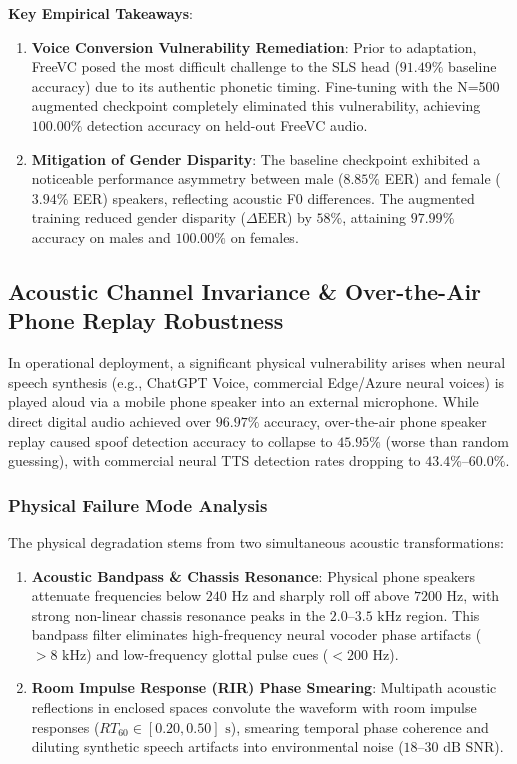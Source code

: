 \documentclass[11pt,a4paper]{article}
\begin{document}
\noindent\textbf{Key Empirical Takeaways}:
\begin{enumerate}
    \item \textbf{Voice Conversion Vulnerability Remediation}: Prior to adaptation, FreeVC posed the most difficult challenge to the SLS head ($91.49\%$ baseline accuracy) due to its authentic phonetic timing. Fine-tuning with the N=500 augmented checkpoint completely eliminated this vulnerability, achieving $100.00\%$ detection accuracy on held-out FreeVC audio.
    \item \textbf{Mitigation of Gender Disparity}: The baseline checkpoint exhibited a noticeable performance asymmetry between male ($8.85\%$ EER) and female ($3.94\%$ EER) speakers, reflecting acoustic F0 differences. The augmented training reduced gender disparity ($\Delta\text{EER}$) by $58\%$, attaining $97.99\%$ accuracy on males and $100.00\%$ on females.
\end{enumerate}

\subsection{Acoustic Channel Invariance \& Over-the-Air Phone Replay Robustness}
\label{sec:channel_robustness}
In operational deployment, a significant physical vulnerability arises when neural speech synthesis (e.g., ChatGPT Voice, commercial Edge/Azure neural voices) is played aloud via a mobile phone speaker into an external microphone. While direct digital audio achieved over $96.97\%$ accuracy, over-the-air phone speaker replay caused spoof detection accuracy to collapse to $45.95\%$ (worse than random guessing), with commercial neural TTS detection rates dropping to $43.4\%$--$60.0\%$.

\subsubsection{Physical Failure Mode Analysis}
The physical degradation stems from two simultaneous acoustic transformations:
\begin{enumerate}
    \item \textbf{Acoustic Bandpass \& Chassis Resonance}: Physical phone speakers attenuate frequencies below $240\text{ Hz}$ and sharply roll off above $7200\text{ Hz}$, with strong non-linear chassis resonance peaks in the $2.0$--$3.5\text{ kHz}$ region. This bandpass filter eliminates high-frequency neural vocoder phase artifacts ($>8\text{ kHz}$) and low-frequency glottal pulse cues ($<200\text{ Hz}$).
    \item \textbf{Room Impulse Response (RIR) Phase Smearing}: Multipath acoustic reflections in enclosed spaces convolute the waveform with room impulse responses ($RT_{60} \in [0.20, 0.50]\text{ s}$), smearing temporal phase coherence and diluting synthetic speech artifacts into environmental noise ($18$--$30\text{ dB SNR}$).
\end{enumerate}
\end{document}
